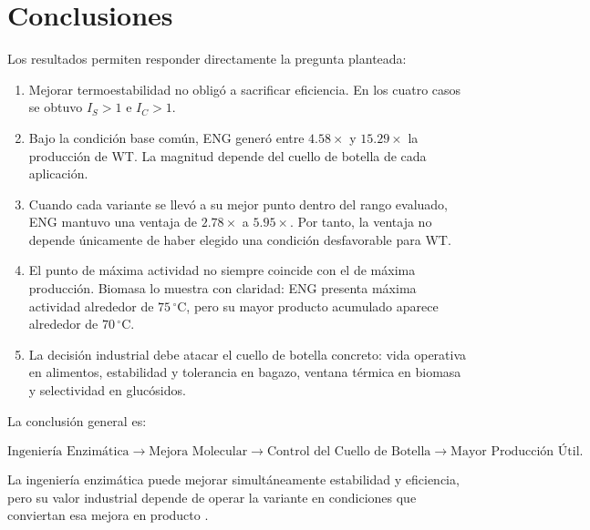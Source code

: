 \section{Conclusiones}
\label{sec:conclusiones}

Los resultados permiten responder directamente la pregunta planteada:

\begin{enumerate}

    \item Mejorar termoestabilidad no obligó a sacrificar eficiencia. En los
    cuatro casos se obtuvo \(I_S>1\) e \(I_C>1\).

    \item Bajo la condición base común, ENG generó entre \(4.58\times\) y
    \(15.29\times\) la producción de WT. La magnitud depende del cuello de
    botella de cada aplicación.

    \item Cuando cada variante se llevó a su mejor punto dentro del rango
    evaluado, ENG mantuvo una ventaja de \(2.78\times\) a \(5.95\times\).
    Por tanto, la ventaja no depende únicamente de haber elegido una condición
    desfavorable para WT.

    \item El punto de máxima actividad no siempre coincide con el de máxima
    producción. Biomasa lo muestra con claridad: ENG presenta máxima actividad
    alrededor de \(75\,^{\circ}\mathrm{C}\), pero su mayor producto acumulado
    aparece alrededor de \(70\,^{\circ}\mathrm{C}\).

    \item La decisión industrial debe atacar el cuello de botella concreto:
    vida operativa en alimentos, estabilidad y tolerancia en bagazo, ventana
    térmica en biomasa y selectividad en glucósidos.
\end{enumerate}

La conclusión general es:

\begin{equation}
\text{Ingeniería Enzimática}
\longrightarrow
\text{Mejora Molecular}
\longrightarrow
\text{Control del Cuello de Botella}
\longrightarrow
\text{Mayor Producción Útil}.
\end{equation}

La ingeniería enzimática puede mejorar simultáneamente estabilidad y eficiencia,
pero su valor industrial depende de operar la variante en condiciones que
conviertan esa mejora en producto
\citep{siddiqui_defying_2017,hou_tradeoff_2023}.
